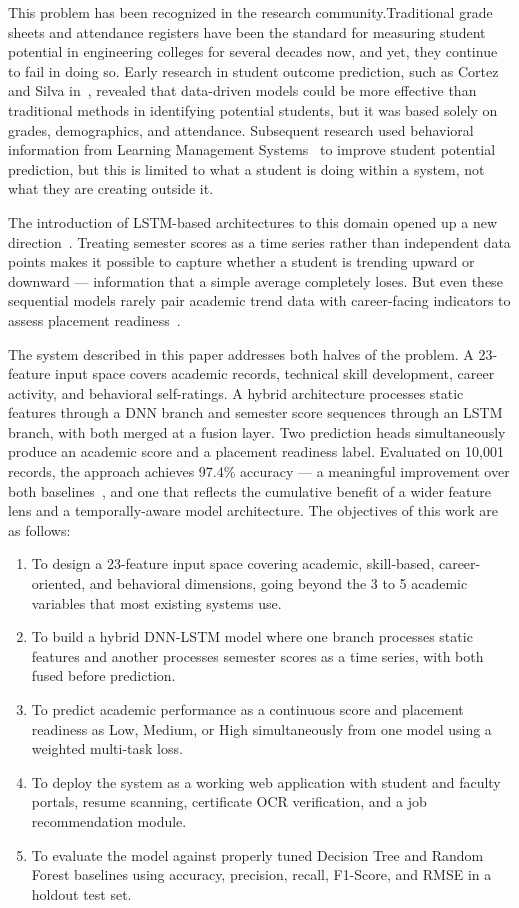 \documentclass[conference]{IEEEtran}
\begin{document}
This problem has been recognized in the research community.Traditional grade sheets and attendance registers have been the standard for measuring student potential in engineering colleges for several decades now, and yet, they continue to fail in doing so. Early research in student outcome prediction, such as Cortez and Silva in~\cite{R1}, revealed that data-driven models could be more effective than traditional methods in identifying potential students, but it was based solely on grades, demographics, and attendance. Subsequent research used behavioral information from Learning Management Systems~\cite{R2,R3} to improve student potential prediction, but this is limited to what a student is doing within a system, not what they are creating outside it.

The introduction of LSTM-based architectures to this domain opened up a new direction~\cite{R5,R6}. Treating semester scores as a time series rather than independent data points makes it possible to capture whether a student is trending upward or downward — information that a simple average completely loses. But even these sequential models rarely pair academic trend data with career-facing indicators to assess placement readiness~\cite{R7}.

The system described in this paper addresses both halves of the problem. A 23-feature input space covers academic records, technical skill development, career activity, and behavioral self-ratings. A hybrid architecture processes static features through a DNN branch and semester score sequences through an LSTM branch, with both merged at a fusion layer. Two prediction heads simultaneously produce an academic score and a placement readiness label. Evaluated on 10,001 records, the approach achieves 97.4\% accuracy — a meaningful improvement over both baselines~\cite{R9,R10}, and one that reflects the cumulative benefit of a wider feature lens and a temporally-aware model architecture.
The objectives of this work are as follows:
\begin{enumerate}
    \item To design a 23-feature input space covering academic, skill-based, career-oriented, and behavioral dimensions, going beyond the 3 to 5 academic variables that most existing systems use.
    \item To build a hybrid DNN-LSTM model where one branch processes static features and another processes semester scores as a time series, with both fused before prediction.
    \item To predict academic performance as a continuous score and placement readiness as Low, Medium, or High simultaneously from one model using a weighted multi-task loss.
    \item To deploy the system as a working web application with student and faculty portals, resume scanning, certificate OCR verification, and a job recommendation module.
   
    \item To evaluate the model against properly tuned Decision
    Tree and Random Forest baselines using accuracy, precision,
    recall, F1-Score, and RMSE in a holdout test set.
\end{enumerate}
\end{document}

